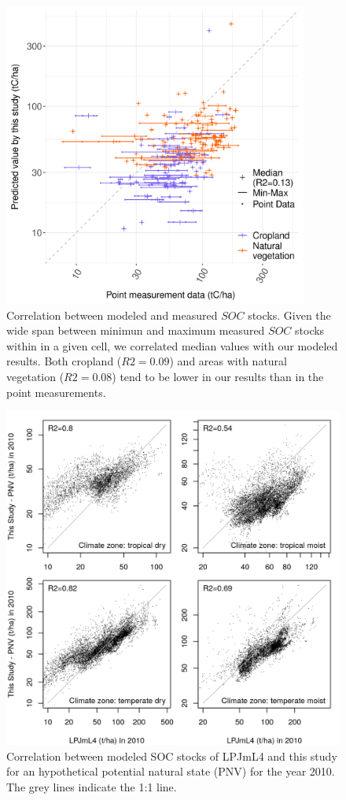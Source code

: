 \documentclass[gc, manuscript]{copernicus}
\begin{document}
\begin{figure}[ht]
\includegraphics[width=10cm]{../ResultNotebooks/Output/Images/scatterComparePointData_2010.png} 
\caption{Correlation between modeled and measured $SOC$ stocks. Given the wide span between minimun and maximum measured $SOC$ stocks within in a given cell, we correlated median values with our modeled results. Both cropland ($R2=0.09$) and areas with natural vegetation ($R2=0.08$) tend to be lower in our results than in the point measurements.}
\label{fig:SOCpoint}
\end{figure}

\newpage

 \begin{figure}[ht]
\includegraphics[width=13cm]{../ResultNotebooks/Output/Images/scatterCompareLPJmL42010_pnv.png}
\caption{Correlation between modeled SOC stocks of LPJmL4 and this study for an hypothetical potential natural state (PNV) for the year 2010. The grey lines indicate the 1:1 line.}
\label{fig:SOCLPJmL4}
\end{figure}
\noappendix
\end{document}
